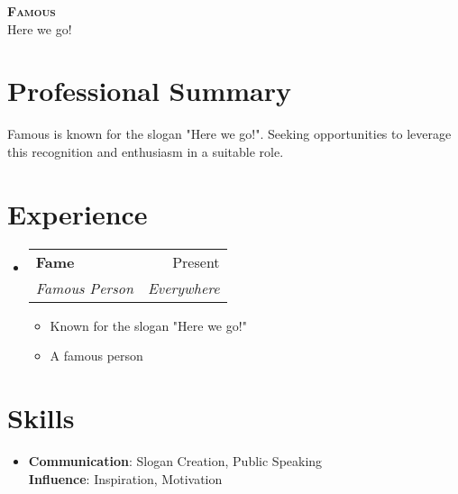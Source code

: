 \documentclass[letterpaper,11pt]{article}
\makeatletter
\newcommand{\resumeItem}[1]{
\item\small{
{#1 \vspace{-2pt}}
}
}
\newcommand{\resumeSubheading}[4]{
\vspace{-2pt}\item
\begin{tabular*}{0.97\textwidth}[t]{l@{\extracolsep{\fill}}r}
\textbf{#1} & #2 \\
\textit{\small#3} & \textit{\small #4} \\
\end{tabular*}\vspace{-7pt}
}
\newcommand{\resumeSubHeadingListStart}{\begin{itemize}[leftmargin=0.15in, label={}]}
\newcommand{\resumeSubHeadingListEnd}{\end{itemize}}
\newcommand{\resumeItemListStart}{\begin{itemize}}
\newcommand{\resumeItemListEnd}{\end{itemize}\vspace{-5pt}}
\makeatother
\begin{document}
\begin{center}
\textbf{\Huge \scshape Famous} \\ \vspace{1pt}
\small Here we go!
\end{center}


\section{Professional Summary} %
Famous is known for the slogan "Here we go!". Seeking opportunities to leverage this recognition and enthusiasm in a suitable role.

\section{Experience}
\resumeSubHeadingListStart
\resumeSubheading{Fame}{Present}{Famous Person}{Everywhere}
\resumeItemListStart
\resumeItem{Known for the slogan "Here we go!"}
\resumeItem{A famous person}
\resumeItemListEnd
\resumeSubHeadingListEnd

\section{Skills}
\begin{itemize}[leftmargin=0.15in, label={}]
\item{
\textbf{Communication}{: Slogan Creation, Public Speaking} \\
\textbf{Influence}{: Inspiration, Motivation}
} \\
\end{itemize}

\end{document}
